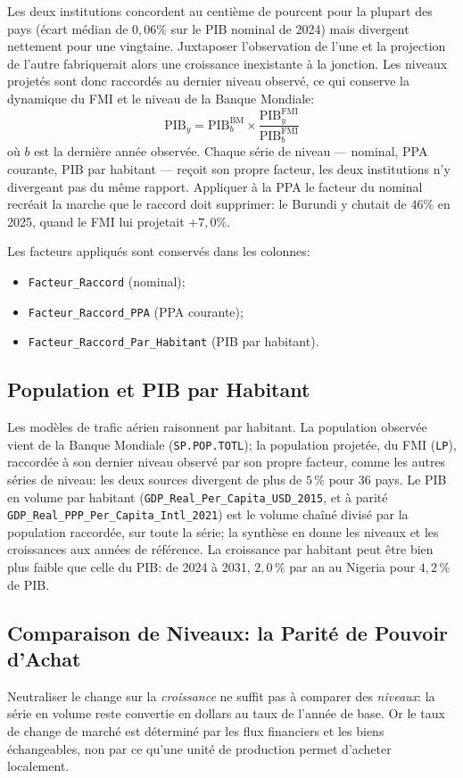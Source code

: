 \documentclass[11pt,a4paper]{article}
\begin{document}
Les deux institutions concordent au centième de pourcent pour la plupart des pays (écart médian de $0{,}06\%$ sur le PIB nominal de 2024) mais divergent nettement pour une vingtaine. Juxtaposer l'observation de l'une et la projection de l'autre fabriquerait alors une croissance inexistante à la jonction. Les niveaux projetés sont donc raccordés au dernier niveau observé, ce qui conserve la dynamique du FMI et le niveau de la Banque Mondiale:
\begin{equation}
\text{PIB}_{y} = \text{PIB}^{\text{BM}}_{b} \times \frac{\text{PIB}^{\text{FMI}}_{y}}{\text{PIB}^{\text{FMI}}_{b}}
\end{equation}
où $b$ est la dernière année observée. Chaque série de niveau --- nominal, PPA courante, PIB par habitant --- reçoit son propre facteur, les deux institutions n'y divergeant pas du même rapport. Appliquer à la PPA le facteur du nominal recréait la marche que le raccord doit supprimer: le Burundi y chutait de $46\%$ en 2025, quand le FMI lui projetait $+7{,}0\%$.

Les facteurs appliqués sont conservés dans les colonnes:
\begin{itemize}
    \item \texttt{Facteur\_Raccord} (nominal);
    \item \texttt{Facteur\_Raccord\_PPA} (PPA courante);
    \item \texttt{Facteur\_Raccord\_Par\_Habitant} (PIB par habitant).
\end{itemize}

\subsection{Population et PIB par Habitant}
Les modèles de trafic aérien raisonnent par habitant. La population observée vient de la Banque Mondiale (\texttt{SP.POP.TOTL}); la population projetée, du FMI (\texttt{LP}), raccordée à son dernier niveau observé par son propre facteur, comme les autres séries de niveau: les deux sources divergent de plus de $5\,\%$ pour 36 pays. Le PIB en volume par habitant (\texttt{GDP\_Real\_Per\_Capita\_USD\_2015}, et à parité \texttt{GDP\_Real\_PPP\_Per\_Capita\_Intl\_2021}) est le volume chaîné divisé par la population raccordée, sur toute la série; la synthèse en donne les niveaux et les croissances aux années de référence. La croissance par habitant peut être bien plus faible que celle du PIB: de 2024 à 2031, $2{,}0\,\%$ par an au Nigeria pour $4{,}2\,\%$ de PIB.

\subsection{Comparaison de Niveaux: la Parité de Pouvoir d'Achat}
Neutraliser le change sur la \emph{croissance} ne suffit pas à comparer des \emph{niveaux}: la série en volume reste convertie en dollars au taux de l'année de base. Or le taux de change de marché est déterminé par les flux financiers et les biens échangeables, non par ce qu'une unité de production permet d'acheter localement.
\end{document}
